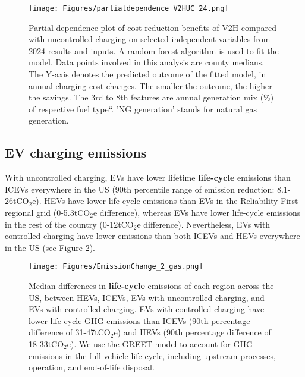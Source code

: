 \documentclass[11pt,preprint]{elsarticle}
\begin{document}
\begin{figure}[H]
    \centering
    \texttt{[image: Figures/partialdependence\_V2HUC\_24.png]}
    \caption{Partial dependence plot of cost reduction benefits of V2H compared with uncontrolled charging on selected independent variables from 2024 results and inputs. A random forest algorithm is used to fit the model. Data points involved in this analysis are county medians. The Y-axis denotes the predicted outcome of the fitted model, in annual charging cost changes. The smaller the outcome, the higher the savings. The 3rd to 8th features are annual generation mix (\%) of respective fuel type``. 'NG generation' stands for natural gas generation. }
    \label{fig:24pdp}
\end{figure}



\subsection{EV charging emissions}

With uncontrolled charging, EVs have lower lifetime \textbf{life-cycle} emissions than ICEVs everywhere in the US (90th percentile range of emission reduction: 8.1-26tCO$_2$e). HEVs have lower life-cycle emissions than EVs in the Reliability First regional grid (0-5.3tCO$_2$e difference), whereas EVs have lower life-cycle emissions in the rest of the country (0-12tCO$_2$e difference). Nevertheless, EVs with controlled charging have lower emissions than both ICEVs and HEVs everywhere in the US (see Figure \ref{fig:emissionchange_gas}).

\begin{figure}[H]
    \centering
    \texttt{[image: Figures/EmissionChange\_2\_gas.png]}
    \caption{Median differences in \textbf{life-cycle} emissions of each region across the US, between HEVs, ICEVs, EVs with uncontrolled charging, and EVs with controlled charging. EVs with controlled charging have lower life-cycle GHG emissions than ICEVs (90th percentage difference of 31-47tCO$_2$e) and HEVs (90th percentage difference of 18-33tCO$_2$e). We use the GREET model to account for GHG emissions in the full vehicle life cycle, including upstream processes, operation, and end-of-life disposal.}
    \label{fig:emissionchange_gas}
\end{figure}
\end{document}
